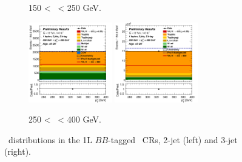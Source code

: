 \begin{figure}[h!]
\begin{subfigure}[b]{\textwidth}
        \caption{150 < \ptv\ < 250 GeV.}
        \label{fig:plots_VHbb_1L_150_CRH}
    \end{subfigure}
    \begin{subfigure}[b]{\textwidth}
        \centering
        \includegraphics[width=0.40\textwidth]{Images/VH/Own_fit/postfit_VHbb/Region_distpTV_BMax400_BMin250_DCRHigh_J2_TTypebb_T2_L1_Y6051_GlobalFit_conditionnal_mu1.png}
        \includegraphics[width=0.40\textwidth]{Images/VH/Own_fit/postfit_VHbb/Region_distpTV_BMax400_BMin250_DCRHigh_J3_TTypebb_T2_L1_Y6051_GlobalFit_conditionnal_mu1.png}
        \caption{250 < \ptv\ < 400 GeV.}
        \label{fig:plots_VHbb_1L_250_CRH}
    \end{subfigure}
    \caption{\ptv\ distributions in the 1L $BB$-tagged \highdr\ CRs, 2-jet (left) and 3-jet (right).}
    \label{fig:plots_VHbb_1L_CRH}
\end{figure} 

\vspace*{\fill} \clearpage
\vspace*{\fill}


